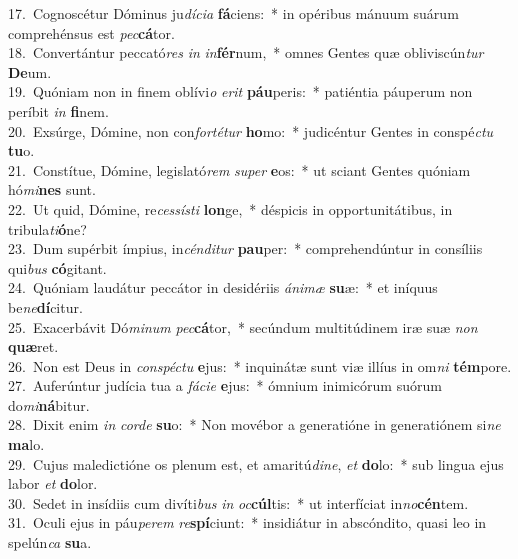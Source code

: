 {17.~}Cognoscétur Dóminus ju\textit{dí}\textit{ci}\textit{a} \textbf{fá}ciens:~* in opéribus mánuum suárum comprehénsus est \textit{pec}\textbf{cá}tor.\\
{18.~}Convertántur peccató\textit{res} \textit{in} \textit{in}\textbf{fér}num,~* omnes Gentes quæ obliviscún\textit{tur} \textbf{De}um.\\
{19.~}Quóniam non in finem oblívi\textit{o} \textit{e}\textit{rit} \textbf{páu}peris:~* patiéntia páuperum non períbit \textit{in} \textbf{fi}nem.\\
{20.~}Exsúrge, Dómine, non con\textit{for}\textit{té}\textit{tur} \textbf{ho}mo:~* judicéntur Gentes in conspé\textit{ctu} \textbf{tu}o.\\
{21.~}Constítue, Dómine, legislató\textit{rem} \textit{su}\textit{per} \textbf{e}os:~* ut sciant Gentes quóniam hó\textit{mi}\textbf{nes} sunt.\\
{22.~}Ut quid, Dómine, re\textit{ces}\textit{sí}\textit{sti} \textbf{lon}ge,~* déspicis in opportunitátibus, in tribula\textit{ti}\textbf{ó}ne?\\
{23.~}Dum supérbit ímpius, in\textit{cén}\textit{di}\textit{tur} \textbf{pau}per:~* comprehendúntur in consíliis qui\textit{bus} \textbf{có}gitant.\\
{24.~}Quóniam laudátur peccátor in desidériis \textit{á}\textit{ni}\textit{mæ} \textbf{su}æ:~* et iníquus be\textit{ne}\textbf{dí}citur.\\
{25.~}Exacerbávit Dó\textit{mi}\textit{num} \textit{pec}\textbf{cá}tor,~* secúndum multitúdinem iræ suæ \textit{non} \textbf{quæ}ret.\\
{26.~}Non est Deus in \textit{con}\textit{spé}\textit{ctu} \textbf{e}jus:~* inquinátæ sunt viæ illíus in om\textit{ni} \textbf{tém}pore.\\
{27.~}Auferúntur judícia tua a \textit{fá}\textit{ci}\textit{e} \textbf{e}jus:~* ómnium inimicórum suórum do\textit{mi}\textbf{ná}bitur.\\
{28.~}Dixit enim \textit{in} \textit{cor}\textit{de} \textbf{su}o:~* Non movébor a generatióne in generatiónem si\textit{ne} \textbf{ma}lo.\\
{29.~}Cujus maledictióne os plenum est, et amaritú\textit{di}\textit{ne}, \textit{et} \textbf{do}lo:~* sub lingua ejus labor \textit{et} \textbf{do}lor.\\
{30.~}Sedet in insídiis cum divíti\textit{bus} \textit{in} \textit{oc}\textbf{cúl}tis:~* ut interfíciat in\textit{no}\textbf{cén}tem.\\
{31.~}Oculi ejus in páu\textit{pe}\textit{rem} \textit{re}\textbf{spí}ciunt:~* insidiátur in abscóndito, quasi leo in spelún\textit{ca} \textbf{su}a.\\
